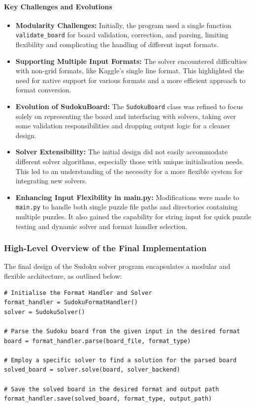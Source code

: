\documentclass[11pt]{article}
\begin{document}
\paragraph{Key Challenges and Evolutions}
\begin{itemize}
    \item \textbf{Modularity Challenges:} Initially, the program used a single function \texttt{validate\_board} for board validation, correction, and parsing, limiting flexibility and complicating the handling of different input formats.
    
    \item \textbf{Supporting Multiple Input Formats:} The solver encountered difficulties with non-grid formats, like Kaggle's single line format. This highlighted the need for native support for various formats and a more efficient approach to format conversion.

    \item \textbf{Evolution of SudokuBoard:} The \texttt{SudokuBoard} class was refined to focus solely on representing the board and interfacing with solvers, taking over some validation responsibilities and dropping output logic for a cleaner design.

    \item \textbf{Solver Extensibility:} The initial design did not easily accommodate different solver algorithms, especially those with unique initialisation needs. This led to an understanding of the necessity for a more flexible system for integrating new solvers.

    \item \textbf{Enhancing Input Flexibility in main.py:} Modifications were made to \texttt{main.py} to handle both single puzzle file paths and directories containing multiple puzzles. It also gained the capability for string input for quick puzzle testing and dynamic solver and format handler selection.
\end{itemize}


\subsubsection{High-Level Overview of the Final Implementation}
The final design of the Sudoku solver program encapsulates a modular and flexible architecture, as outlined below:

\begin{verbatim}
# Initialise the Format Handler and Solver
format_handler = SudokuFormatHandler()
solver = SudokuSolver()

# Parse the Sudoku board from the given input in the desired format
board = format_handler.parse(board_file, format_type)

# Employ a specific solver to find a solution for the parsed board 
solved_board = solver.solve(board, solver_backend)

# Save the solved board in the desired format and output path
format_handler.save(solved_board, format_type, output_path)
\end{verbatim}
\end{document}
